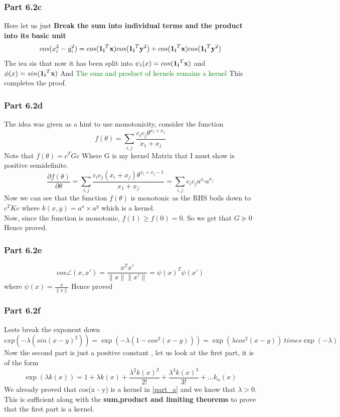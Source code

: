 \subsubsection{Part 6.2c}
Here let us just \textbf{Break the sum into individual terms and the product into its basic unit}
$$
    cos(x_i^2 - y_i^2) = cos(\vb{1_i}^T \vb{x}) cos(\vb{1_i}^T\vb{y}^2) + cos(\vb{1_i}^T \vb{x}) cos(\vb{1_i}^T\vb{y}^2) 
$$
The iea sis that now it has been split into $\psi_i(x) = cos(\vb{1_i}^T \vb{x})$ and $\phi(x) = sin(\vb{1_i}^T \vb{x})$
And \textcolor{green}{The sum and product of kernels remains a kernel} This completes the proof.

\subsubsection{Part 6.2d}
The idea was given as a hint to use monotonicity,
consider the function
$$
f(\theta) = \sum_{i, j} \frac{c_i c_j \theta^{x_i + x_j}}{x_1 + x_j}
$$
Note that $f(\theta) = c^TGc $ Where G is my kernel Matrix that I must show is positive semidefinite.
$$
    \frac{\partial f(\theta)}{\partial \theta} = \sum_{i, j} \frac{c_i c_j (x_i + x_j)\theta^{x_i + x_j - 1}}{x_1 + x_j} = \sum_{i, j} c_ic_ja^{x_i}a^{x_j}
$$
Now we can see that the function $f(\theta)$ is monotonic as the RHS boils down to $c^TKc$ where $k(x, y) = a^x \times a^y$ which is a kernel. 
\\
Now, since the function is monotonic, $f(1) \ge f(0) = 0$. So we get that $G \succcurlyeq 0$ Hence proved.

\subsubsection{Part 6.2e}
$$
cos \angle(x, x')  = \frac{x^Tx'}{\|x\| \|x'\|} = \psi(x)^T \psi(x')
$$
where $\psi(x) = \frac{x}{\|x\|}$
Hence proved

\subsubsection{Part 6.2f}
Lests break the exponent down
$$
    exp(-\lambda( sin(x - y)^2)) = \exp( -\lambda (1 - cos^2( x- y))) = \exp(\lambda cos^2(x - y)) \ times \exp( - \lambda)
$$
Now the second part is just a  positive constant , let us look at the first part, it is of the form
$$
    \exp(\lambda k(x)) = 1 + \lambda k(x) + \frac{\lambda^2 k(x)^2}{2!} + \frac{\lambda^3 k(x)^3}{3!} + \ldots k_n(x)
$$
We already proved that cos(x - y) is a kernel in \ref{part_a} and we know that $\lambda > 0$. This is  sufficient along with 
the \textbf{sum,product and limiting theorems} to prove that the first part is a kernel.

